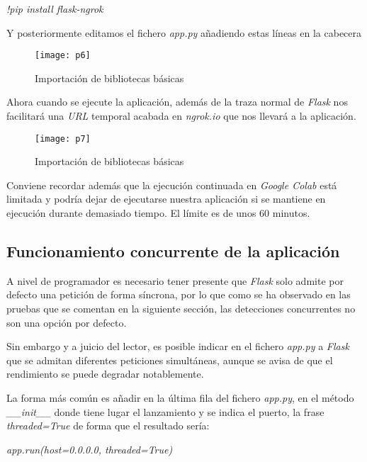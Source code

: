 \begin{enumerate}
    \emph{!pip install flask-ngrok}
    
    Y posteriormente editamos el fichero \emph{app.py} añadiendo estas líneas en la cabecera
    
    \begin{figure}[htb]
	\centering
	\texttt{[image: p6]}
	\caption[Importación de bibliotecas básicas]{Importación de bibliotecas básicas}
    \end{figure}
    
    Ahora cuando se ejecute la aplicación, además de la traza normal de \emph{Flask} nos facilitará una \emph{URL} temporal acabada en \emph{ngrok.io} que nos llevará a la aplicación.
    
    \begin{figure}[htb]
	\centering
	\texttt{[image: p7]}
	\caption[Importación de bibliotecas básicas]{Importación de bibliotecas básicas}
    \end{figure}
    
    Conviene recordar además que la ejecución continuada en \emph{Google Colab} está limitada y podría dejar de ejecutarse nuestra aplicación si se mantiene en ejecución durante demasiado tiempo. El límite es de unos 60 minutos.
    
\end{enumerate}

\clearpage

\subsection{Funcionamiento concurrente de la aplicación}
A nivel de programador es necesario tener presente que \emph{Flask} solo admite por defecto una petición de forma síncrona, por lo que como se ha observado en las pruebas que se comentan en la siguiente sección, las detecciones concurrentes no son una opción por defecto.

Sin embargo y a juicio del lector, es posible indicar en el fichero \emph{app.py} a \emph{Flask} que se admitan diferentes peticiones simultáneas, aunque se avisa de que el rendimiento se puede degradar notablemente.

La forma más común es añadir en la última fila del fichero \emph{app.py}, en el método \emph{\_\_init\_\_} donde tiene lugar el lanzamiento y se indica el puerto, la frase \emph{threaded=True} de forma que el resultado sería:

\begin{center}\emph{app.run(host=0.0.0.0, threaded=True)}\end{center}

